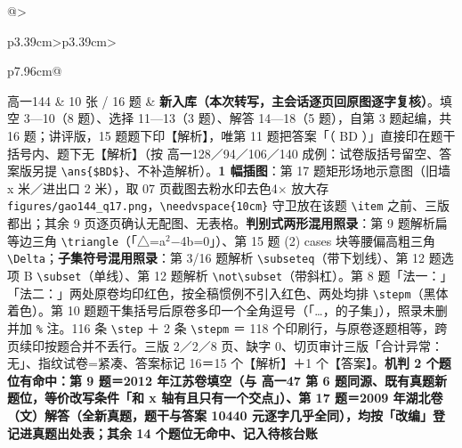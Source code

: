 \documentclass[a4paper,11pt]{article}
\begin{document}
\begin{xltabular}{\textwidth}{@{}>{\raggedright\arraybackslash}p{3.39cm}>{\centering\arraybackslash}p{3.39cm}>{\raggedright\arraybackslash}p{7.96cm}@{}}
高一144 & 10 张 / 16 题 & \textbf{新入库（本次转写，主会话逐页回原图逐字复核）}。填空 3---10（8 题）、选择 11---13（3 题）、解答 14---18（5 题），自第 3 题起编，共 16 题；讲评版，15 题题下印【解析】，唯第 11 题把答案「（ BD ）」直接印在题干括号内、题下无【解析】（按 高一128／94／106／140 成例：试卷版括号留空、答案版另提 \texttt{\textbackslash{}ans\{\$BD\$\}}、不补造解析）。\textbf{1 幅插图}：第 17 题矩形场地示意图（旧墙 x 米／进出口 2 米），取 07 页截图去粉水印去色4$\times$ 放大存 \texttt{figures/\allowbreak{}gao144\_q17.png}，\texttt{\textbackslash{}needvspace\{10cm\}} 守卫放在该题 \texttt{\textbackslash{}item} 之前、三版都出；其余 9 页逐页确认无配图、无表格。\textbf{判别式两形混用照录}：第 9 题解析扁等边三角 \texttt{\textbackslash{}triangle}（「△=a$^{2}$−4b=0」）、第 15 题 (2) cases 块等腰偏高粗三角 \texttt{\textbackslash{}Delta}；\textbf{子集符号混用照录}：第 3/16 题解析 \texttt{\textbackslash{}subseteq}（带下划线）、第 12 题选项 B \texttt{\textbackslash{}subset}（单线）、第 12 题解析 \texttt{\textbackslash{}not\textbackslash{}subset}（带斜杠）。第 8 题「法一：」「法二：」两处原卷均印红色，按全稿惯例不引入红色、两处均排 \texttt{\textbackslash{}stepm}（黑体着色）。第 10 题题干集括号后原卷多印一个全角逗号（「\ldots，的子集」），照录未删并加 \texttt{\%} 注。116 条 \texttt{\textbackslash{}step} ＋ 2 条 \texttt{\textbackslash{}stepm} ＝ 118 个印刷行，与原卷逐题相等，跨页续印按题合并不丢行。三版 2／2／8 页、缺字 0、切页审计三版「合计异常：无」、指纹试卷=紧凑、答案标记 16＝15 个【解析】＋1 个【答案】。\textbf{机判 2 个题位有命中：第 9 题＝2012 年江苏卷填空（与 高一47 第 6 题同源、既有真题新题位，等价改写条件「和 x 轴有且只有一个交点」）、第 17 题＝2009 年湖北卷（文）解答（全新真题，题干与答案 10440 元逐字几乎全同），均按「改编」登记进真题出处表；其余 14 个题位无命中、记入待核台账} \\ \addlinespace[1pt]

\end{xltabular}
\end{document}
